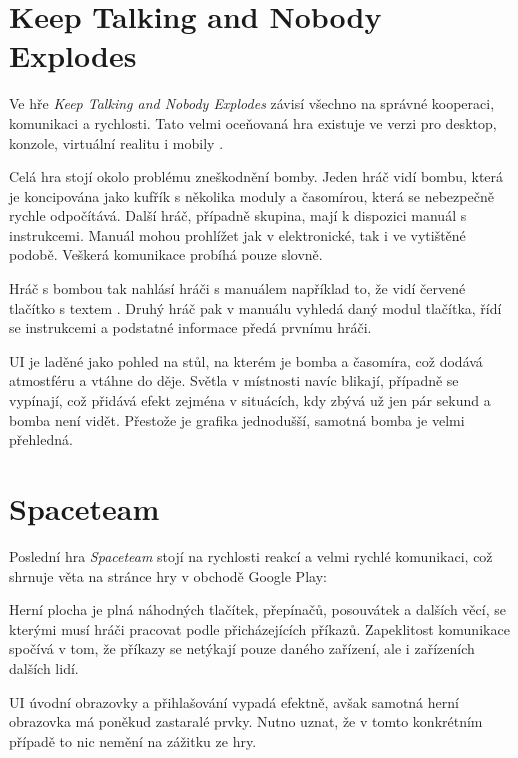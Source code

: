 \section{Keep Talking and Nobody Explodes}

Ve hře \emph{Keep Talking and Nobody Explodes} závisí všechno na správné
kooperaci, komunikaci a rychlosti.
Tato velmi oceňovaná hra existuje ve verzi pro desktop, konzole,
virtuální realitu i mobily \cite{steelcrategamesinc_keep}.

Celá hra stojí okolo problému zneškodnění bomby.
Jeden hráč vidí bombu, která je koncipována jako kufřík s několika moduly
a časomírou, která se nebezpečně rychle odpočítává.
Další hráč, případně skupina, mají k dispozici manuál s instrukcemi.
Manuál mohou prohlížet jak v elektronické, tak i ve vytištěné podobě.
Veškerá komunikace probíhá pouze slovně.

Hráč s bombou tak nahlásí hráči s manuálem například to,
že vidí červené tlačítko s textem .
Druhý hráč pak v manuálu vyhledá daný modul tlačítka, řídí se instrukcemi a
podstatné informace předá prvnímu hráči.

UI je laděné jako pohled na stůl, na kterém je bomba a časomíra,
což dodává atmostféru a vtáhne do děje.
Světla v místnosti navíc blikají, případně se vypínají,
což přidává efekt zejména v situácích, kdy zbývá už jen pár sekund a bomba není
vidět.
Přestože je grafika jednodušší, samotná bomba je velmi přehledná.

\section{Spaceteam}

Poslední hra \emph{Spaceteam} stojí na rychlosti reakcí a velmi rychlé
komunikaci, což shrnuje věta na stránce hry \cite{henrysmithinc_spaceteam}
v obchodě Google Play: 

Herní plocha je plná náhodných tlačítek, přepínačů, posouvátek a dalších věcí,
se kterými musí hráči pracovat podle přicházejících
 příkazů.
Zapeklitost komunikace spočívá v tom, že příkazy se netýkají pouze daného
zařízení, ale i zařízeních dalších lidí.

UI úvodní obrazovky a přihlašování vypadá efektně, avšak samotná herní obrazovka
má poněkud zastaralé prvky.
Nutno uznat, že v tomto konkrétním případě to nic nemění na zážitku ze hry.
